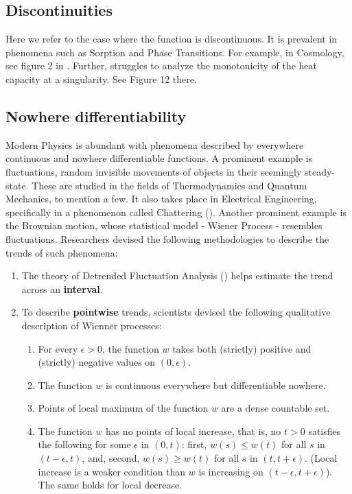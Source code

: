 \documentclass[11pt]{book}
\begin{document}
\subsection{Discontinuities}
Here we refer to the case where the function is discontinuous. It is prevalent in phenomena such as
Sorption and Phase Transitions. For example, in Cosmology, see figure
2 in \cite{kumar2020phase}.
Further, \cite{schwartzlecture} struggles to analyze the monotonicity
of the heat capacity at a singularity. See Figure 12 there.
\subsection{Nowhere differentiability}
\label{nowhere_differentiability}
Modern Physics is abundant with phenomena described by everywhere continuous and nowhere differentiable functions. A prominent example is fluctuations, random invisible movements of objects in their seemingly steady-state. These are studied in the fields of Thermodynamics and Quantum Mechanics, to mention a few. It also takes place in Electrical Engineering, specifically in a phenomenon
called Chattering (\cite{levant2010chattering}). Another prominent example is the Brownian motion, whose statistical model - Wiener Process - resembles fluctuations. Researchers devised the following methodologies to describe the trends of such phenomena:
\begin{enumerate}
\item The theory of Detrended Fluctuation Analysis (\cite{peng1994mosaic})
helps estimate the trend across an \textbf{interval}.
\item To describe \textbf{pointwise} trends, scientists devised the following
qualitative description of Wienner processes:
\begin{enumerate}
\item For every $\epsilon>0$, the function $w$ takes both (strictly) positive
and (strictly) negative values on $\left(0,\epsilon\right)$.
\item The function $w$ is continuous everywhere but differentiable nowhere.
\item Points of local maximum of the function $w$ are a dense countable
set.
\item The function $w$ has no points of local increase, that is, no $t>0$
satisfies the following for some $\epsilon$ in $\left(0,t\right)$:
first, $w\left(s\right)\leq w\left(t\right)$ for all $s$ in $\left(t-\epsilon,t\right)$,
and, second, $w\left(s\right)\geq w\left(t\right)$ for all $s$ in
$\left(t,t+\epsilon\right)$. (Local increase is a weaker condition
than $w$ is increasing on $\left(t-\epsilon,t+\epsilon\right)$).
The same holds for local decrease.
\end{enumerate}
\end{enumerate}
\end{document}
